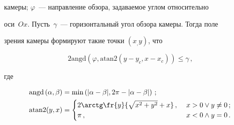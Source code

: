 камеры; $\varphi$~--- направление обзора, задаваемое углом относительно 

оси~$Ox$. Пусть~$\gamma$~--- горизонтальный угол обзора камеры. Тогда поле 

зрения камеры формируют такие точки $(x_, y)$, что



\noindent

  $$

  2\mathrm{angd} \left(\varphi, \mathrm{atan}2 \left(y-y_c, x-x_c\right)\right) \leq \gamma\,,

  $$

   где 

   \begin{align*}

   \mathrm{angd}\left(\alpha,\beta\right)&=\min \left(\vert \alpha-\beta\vert, 2\pi-

\vert\alpha-\beta\vert\right)\,; 

\\

  \mathrm{atan2}(y,x)&=\begin{cases}

  2\arctg \fr{y}{\sqrt{x^2+y^2}+x}\,, &\ x>0 \vee y\not= 0\,;\\

  \pi\,, &\ x<0\wedge y=0\,.

  \end{cases}

  \end{align*}

  


